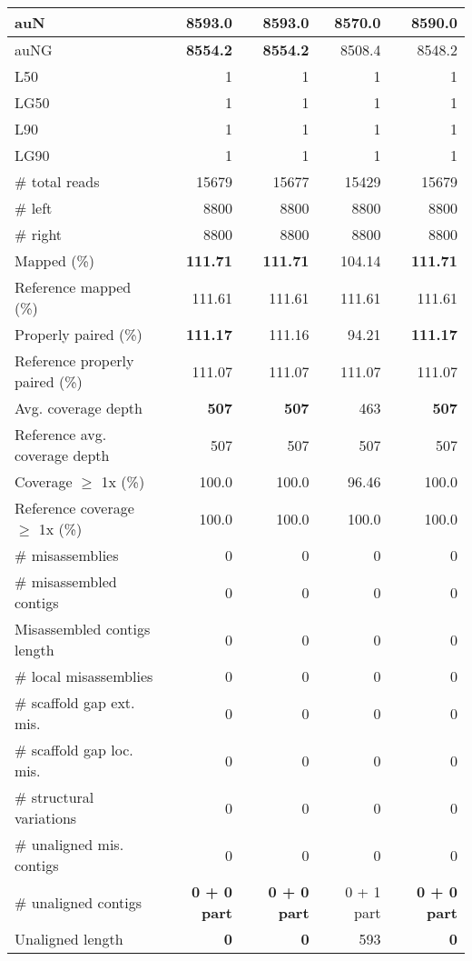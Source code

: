 \documentclass[12pt,a4paper]{article}
\begin{document}
\begin{table}[ht]
\begin{center}
\begin{tabular}{|l*{4}{|r}|}
auN & {\bf 8593.0} & {\bf 8593.0} & 8570.0 & 8590.0 \\ \hline
auNG & {\bf 8554.2} & {\bf 8554.2} & 8508.4 & 8548.2 \\ \hline
L50 & 1 & 1 & 1 & 1 \\ \hline
LG50 & 1 & 1 & 1 & 1 \\ \hline
L90 & 1 & 1 & 1 & 1 \\ \hline
LG90 & 1 & 1 & 1 & 1 \\ \hline
\# total reads & 15679 & 15677 & 15429 & 15679 \\ \hline
\# left & 8800 & 8800 & 8800 & 8800 \\ \hline
\# right & 8800 & 8800 & 8800 & 8800 \\ \hline
Mapped (\%) & {\bf 111.71} & {\bf 111.71} & 104.14 & {\bf 111.71} \\ \hline
Reference mapped (\%) & 111.61 & 111.61 & 111.61 & 111.61 \\ \hline
Properly paired (\%) & {\bf 111.17} & 111.16 & 94.21 & {\bf 111.17} \\ \hline
Reference properly paired (\%) & 111.07 & 111.07 & 111.07 & 111.07 \\ \hline
Avg. coverage depth & {\bf 507} & {\bf 507} & 463 & {\bf 507} \\ \hline
Reference avg. coverage depth & 507 & 507 & 507 & 507 \\ \hline
Coverage $\geq$ 1x (\%) & 100.0 & 100.0 & 96.46 & 100.0 \\ \hline
Reference coverage $\geq$ 1x (\%) & 100.0 & 100.0 & 100.0 & 100.0 \\ \hline
\# misassemblies & 0 & 0 & 0 & 0 \\ \hline
\# misassembled contigs & 0 & 0 & 0 & 0 \\ \hline
Misassembled contigs length & 0 & 0 & 0 & 0 \\ \hline
\# local misassemblies & 0 & 0 & 0 & 0 \\ \hline
\# scaffold gap ext. mis. & 0 & 0 & 0 & 0 \\ \hline
\# scaffold gap loc. mis. & 0 & 0 & 0 & 0 \\ \hline
\# structural variations & 0 & 0 & 0 & 0 \\ \hline
\# unaligned mis. contigs & 0 & 0 & 0 & 0 \\ \hline
\# unaligned contigs & {\bf 0 + 0 part} & {\bf 0 + 0 part} & 0 + 1 part & {\bf 0 + 0 part} \\ \hline
Unaligned length & {\bf 0} & {\bf 0} & 593 & {\bf 0} \\ \hline

\end{tabular}
\end{center}
\end{table}
\end{document}
